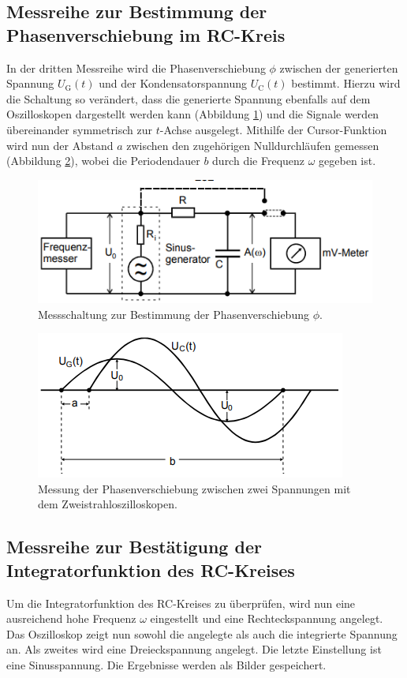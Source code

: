 \subsection{Messreihe zur Bestimmung der Phasenverschiebung im RC-Kreis}
In der dritten Messreihe wird die Phasenverschiebung $\phi$ zwischen der generierten 
Spannung $U_\text{G}(t)$ und der Kondensatorspannung $U_\text{C}(t)$ bestimmt.
Hierzu wird die Schaltung so verändert, dass die generierte Spannung ebenfalls auf 
dem Oszilloskopen dargestellt werden kann (Abbildung \ref{fig:v353_3}) und die Signale 
werden übereinander 
symmetrisch zur $t$-Achse ausgelegt. Mithilfe der Cursor-Funktion wird nun der Abstand
$a$ zwischen den zugehörigen Nulldurchläufen gemessen (Abbildung \ref{fig:phi}), wobei
die Periodendauer $b$ durch die Frequenz $\omega$ gegeben ist.
\begin{figure}[H]
  \centering
  \includegraphics{V353_2.png}
  \caption{Messschaltung zur Bestimmung der Phasenverschiebung $\phi$. \cite[S. 7]{kent}}
  \label{fig:v353_3}
\end{figure}
\begin{figure}
  \centering
  \includegraphics{phi.png}
  \caption{Messung der Phasenverschiebung zwischen zwei Spannungen mit dem
Zweistrahloszilloskopen. \cite[S. 7]{kent}}
  \label{fig:phi}
\end{figure}

\subsection{Messreihe zur Bestätigung der Integratorfunktion des RC-Kreises}
Um die Integratorfunktion des RC-Kreises zu überprüfen, wird nun eine ausreichend hohe
Frequenz $\omega$ eingestellt und eine Rechteckspannung angelegt. Das Oszilloskop 
zeigt nun sowohl die angelegte als auch die integrierte Spannung an. Als zweites wird eine
Dreieckspannung angelegt. Die letzte Einstellung ist eine Sinusspannung. Die Ergebnisse
werden als Bilder gespeichert.